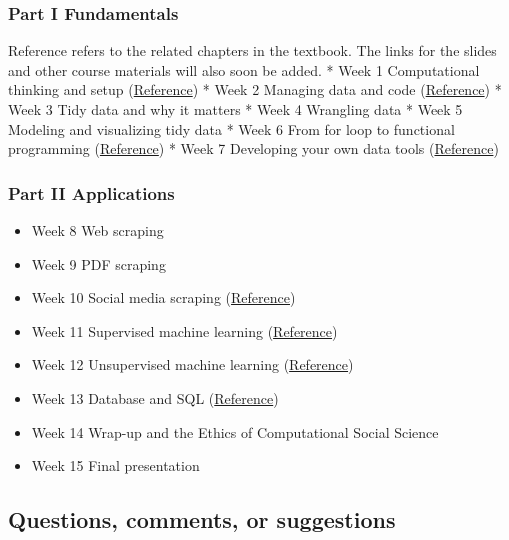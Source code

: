 \documentclass[
]{article}
\providecommand{\tightlist}{%
  \setlength{\itemsep}{0pt}\setlength{\parskip}{0pt}}
\begin{document}
\hypertarget{part-i-fundamentals-1}{%
\subsubsection{Part I Fundamentals}\label{part-i-fundamentals-1}}

Reference refers to the related chapters in the textbook. The links for
the slides and other course materials will also soon be added. * Week 1
Computational thinking and setup
(\href{https://jaeyk.github.io/PS239T/motivation.html}{Reference}) *
Week 2 Managing data and code
(\href{https://jaeyk.github.io/PS239T/git-bash.html}{Reference}) * Week
3 Tidy data and why it matters * Week 4 Wrangling data * Week 5 Modeling
and visualizing tidy data * Week 6 From for loop to functional
programming
(\href{https://jaeyk.github.io/PS239T/functional-programming.html}{Reference})
* Week 7 Developing your own data tools
(\href{https://jaeyk.github.io/PS239T/functional-programming.html\#developing-your-own-data-products}{Reference})

\hypertarget{part-ii-applications-1}{%
\subsubsection{Part II Applications}\label{part-ii-applications-1}}

\begin{itemize}
\tightlist
\item
  Week 8 Web scraping
\item
  Week 9 PDF scraping
\item
  Week 10 Social media scraping
  (\href{https://jaeyk.github.io/PS239T/semi-structured-data.html\#xmljson-government-databasesocial-media-scraping}{Reference})
\item
  Week 11 Supervised machine learning
  (\href{https://jaeyk.github.io/PS239T/machine-learning.html\#supervised-learning}{Reference})
\item
  Week 12 Unsupervised machine learning
  (\href{https://jaeyk.github.io/PS239T/machine-learning.html\#unsupervised-learning}{Reference})
\item
  Week 13 Database and SQL
  (\href{https://jaeyk.github.io/PS239T/git-bash.html}{Reference})
\item
  Week 14 Wrap-up and the Ethics of Computational Social Science
\item
  Week 15 Final presentation
\end{itemize}

\hypertarget{questions-comments-or-suggestions}{%
\subsection{Questions, comments, or
suggestions}\label{questions-comments-or-suggestions}}
\end{document}
